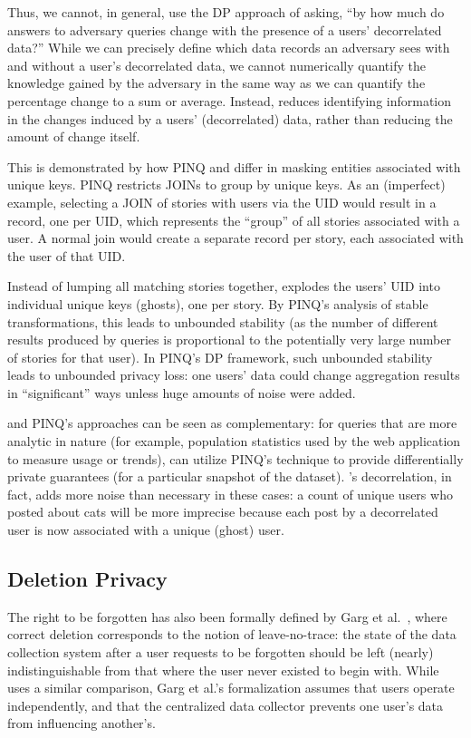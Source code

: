 Thus, we cannot, in general, use the DP approach of asking, ``by how much do answers to adversary
queries change with the presence of a users' decorrelated data?'' While we can precisely define which
data records an adversary sees with and without a user's decorrelated data, we cannot numerically
quantify the knowledge gained by the adversary in the same way as we can quantify the percentage
change to a sum or average.
Instead, \sys{} reduces identifying information in the changes induced by a users' (decorrelated)
data, rather than reducing the amount of change itself.

This is demonstrated by how PINQ and \sys{} differ in masking entities associated with unique keys.
PINQ restricts JOINs to group by unique keys. As an (imperfect) example, selecting a JOIN of stories
with users via the UID would result in a record, one per UID, which represents the ``group'' of all
stories associated with a user. A normal join would create a separate record per story, each
associated with the user of that UID.

Instead of lumping all matching stories together, \sys{} explodes the users' UID into individual
unique keys (ghosts), one per story. By PINQ's analysis of stable transformations, this leads to
unbounded stability (as the number of different results produced by queries is proportional to the
potentially very large number of stories for that user). In PINQ's DP framework, such unbounded
stability leads to unbounded privacy loss: one users' data could change aggregation results in
``significant'' ways unless huge amounts of noise were added. 

\sys{} and PINQ's approaches can be seen as complementary: for queries that are more analytic in nature (for example,
population statistics used by the web application to measure usage or trends), \sys{} can utilize
PINQ's technique to provide differentially private guarantees (for a particular snapshot of the
dataset).  \sys{}'s decorrelation, in fact, adds more noise than necessary in these cases: a count
of unique users who posted about cats will be more imprecise because each post by a decorrelated
user is now associated with a unique (ghost) user.

\subsection{Deletion Privacy}
The right to be forgotten has also been formally defined by Garg et
al.~\cite{garg}, where correct deletion corresponds to the notion of
leave-no-trace: the state of the data collection system after a user requests to be forgotten should
be left (nearly) indistinguishable from that where the user never existed to begin with. While
\sys{} uses a similar comparison, Garg et al.'s formalization assumes that users operate
independently, and that the centralized data collector prevents one user's data from influencing
another's.

